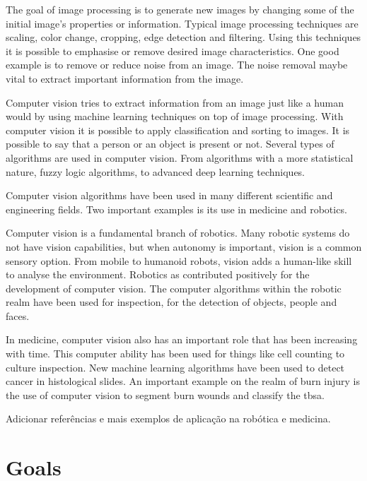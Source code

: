 The goal of image processing is to generate new images by changing some of the initial image's properties or information. Typical image processing techniques are scaling, color change, cropping, edge detection and filtering. Using this techniques it is possible to emphasise or remove desired image characteristics. One good example is to remove or reduce noise from an image. The noise removal maybe vital to extract important information from the image.

Computer vision tries to extract information from an image just like a human would by using machine learning techniques on top of image processing. With computer vision it is possible to apply classification and sorting to images. It is possible to say that a person or an object is present or not. Several types of algorithms are used in computer vision. From algorithms with a more statistical nature, fuzzy logic algorithms, to advanced deep learning techniques.

Computer vision algorithms have been used in many different scientific and engineering fields. Two important examples is its use in medicine and robotics.

Computer vision is a fundamental branch of robotics. Many robotic systems do not have vision capabilities, but when autonomy is important, vision is a common sensory option. From mobile to humanoid robots, vision adds a human-like skill to analyse the environment. Robotics as contributed positively for the development of computer vision. The computer algorithms within the robotic realm have been used for inspection, for the detection of objects, people and faces.

In medicine, computer vision also has an important role that has been increasing with time. This computer ability has been used for things like cell counting to culture inspection. New machine learning algorithms have been used to detect cancer in histological slides. An important example on the realm of burn injury is the use of computer vision to segment burn wounds and classify the \gls{tbsa}.

{\color{red} Adicionar referências e mais exemplos de aplicação na robótica e medicina.}



\section{Goals} %
\label{sec:goals}


